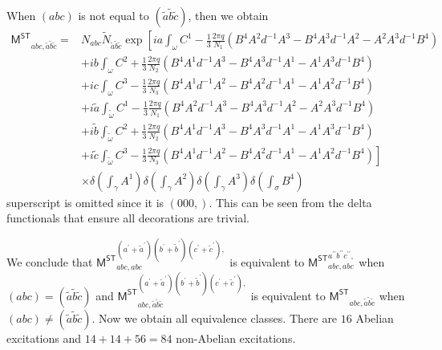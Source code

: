 \documentclass[11pt,nofootinbib,preprint]{revtex4-1}
\begin{document}
When $\left(abc\right)$ is not equal to $\left(\tilde{a}\tilde{b}\tilde{c}\right)$, then we obtain
\begin{align}
	\mathsf{M^{ST}}_{abc,\tilde{a}\tilde{b}\tilde{c}}=&N_{abc}\tilde{N}_{\tilde{a}\tilde{b}\tilde{c}}\exp \left[ ia\int_{\omega}{C^1-\frac{1}{3}\frac{2\pi q}{N_1}\left( B^4A^2d^{-1}A^3-B^4A^3d^{-1}A^2-A^2A^3d^{-1}B^4 \right)} \right. \nonumber
	\\
	&+ib\int_{\omega}{C^2+\frac{1}{3}\frac{2\pi q}{N_2}\left( B^4A^1d^{-1}A^3-B^4A^3d^{-1}A^1-A^1A^3d^{-1}B^4 \right)} \nonumber
	\\
	&+ic\int_{\omega}{C^3-\frac{1}{3}\frac{2\pi q}{N_3}\left( B^4A^1d^{-1}A^2-B^4A^2d^{-1}A^1-A^1A^2d^{-1}B^4 \right)} \nonumber
	\\
	&+i\tilde{a}\int_{\tilde{\omega}}{C^1-\frac{1}{3}\frac{2\pi q}{N_1}\left( B^4A^2d^{-1}A^3-B^4A^3d^{-1}A^2-A^2A^3d^{-1}B^4 \right)} \nonumber
	\\
	&+i\tilde{b}\int_{\tilde{\omega}}{C^2+\frac{1}{3}\frac{2\pi q}{N_2}\left( B^4A^1d^{-1}A^3-B^4A^3d^{-1}A^1-A^1A^3d^{-1}B^4 \right)} \nonumber
	\\
	&+\left. i\tilde{c}\int_{\tilde{\omega}}{C^3-\frac{1}{3}\frac{2\pi q}{N_3}\left( B^4A^1d^{-1}A^2-B^4A^2d^{-1}A^1-A^1A^2d^{-1}B^4 \right)} \right] \nonumber
	\\
	&\times \delta \left( \int_{\gamma}{A^1} \right) \delta \left( \int_{\gamma}{A^2} \right) \delta \left( \int_{\gamma}{A^3} \right) \delta \left( \int_{\sigma}{B^4} \right) 
\end{align}
superscript is omitted since it is $\left(000,\right)$. This can be seen from the delta functionals that ensure all decorations are trivial. 

We conclude that $\mathsf{M^{ST}}_{abc,abc}^{\left( a^{\prime}+\tilde{a}^{\prime} \right) \left( b^{\prime}+\tilde{b}^{\prime} \right) \left( c^{\prime}+\tilde{c}^{\prime} \right),}$ is equivalent to $\mathsf{M^{ST}}_{abc,abc}^{a^{\prime\prime}b^{\prime\prime}c^{\prime\prime},}$ when $\left(abc\right)=\left(\tilde{a}\tilde{b}\tilde{c}\right)$ and $\mathsf{M^{ST}}_{abc,\tilde{a}\tilde{b}\tilde{c}}^{\left( a^{\prime}+\tilde{a}^{\prime} \right) \left( b^{\prime}+\tilde{b}^{\prime} \right) \left( c^{\prime}+\tilde{c}^{\prime} \right),}$ is equivalent to $\mathsf{M^{ST}}_{abc,\tilde{a}\tilde{b}\tilde{c}}$ when $\left(abc\right)\ne\left(\tilde{a}\tilde{b}\tilde{c}\right)$. Now we obtain all equivalence classes. There are $16$ Abelian excitations and $14+14+56=84$ non-Abelian excitations.
\end{document}
